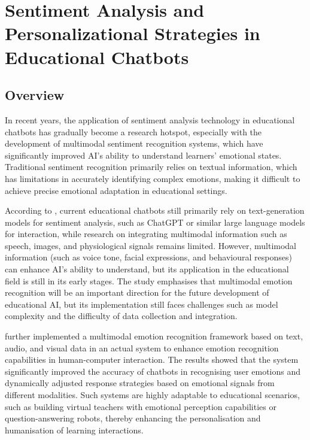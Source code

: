 \documentclass{xum_review}
\begin{document}
\section{Sentiment Analysis and Personalizational Strategies in Educational Chatbots}

\subsection{Overview}
In recent years, the application of sentiment analysis technology in educational
chatbots has gradually become a research hotspot, especially with the
development of multimodal sentiment recognition systems, which have
significantly improved AI's ability to understand learners' emotional states.
Traditional sentiment recognition primarily relies on textual information, which
has limitations in accurately identifying complex emotions, making it difficult
to achieve precise emotional adaptation in educational settings. 

According to \citet{heilala2024overview}, current educational
chatbots still primarily rely on text-generation models for sentiment analysis,
such as ChatGPT or similar large language models for interaction, while research
on integrating multimodal information such as speech, images, and physiological
signals remains limited. However, multimodal information (such as voice tone,
facial expressions, and behavioural responses) can enhance AI's ability to
understand, but its application in the educational field is still in its early
stages. The study emphasises that multimodal emotion recognition will be an
important direction for the future development of educational AI, but its
implementation still faces challenges such as model complexity and the
difficulty of data collection and integration. 

\citet{kovacs2024multimodal} further implemented a multimodal
emotion recognition framework based on text, audio, and visual data in an actual
system to enhance emotion recognition capabilities in human-computer
interaction. The results showed that the system significantly improved the
accuracy of chatbots in recognising user emotions and dynamically adjusted
response strategies based on emotional signals from different modalities. Such
systems are highly adaptable to educational scenarios, such as building virtual
teachers with emotional perception capabilities or question-answering robots,
thereby enhancing the personalisation and humanisation of learning interactions. 
\end{document}
